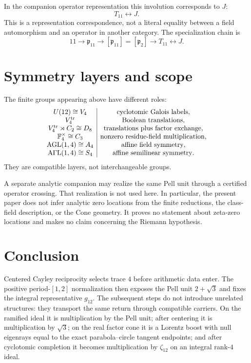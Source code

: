 \documentclass[11pt]{article}
\theoremstyle{remark}
\newcommand{\F}{\mathbb F}
\begin{document}
In the companion operator representation this involution corresponds to $J$:
\[
\boxed{T_{11}\longleftrightarrow J.}
\]
This is a representation correspondence, not a literal equality between a
field automorphism and an operator in another category.  The specialization
chain is
\[
\boxed{
11\longrightarrow\mathfrak p_{11}
\longrightarrow[\mathfrak p_{11}]=[\mathfrak p_2]
\longrightarrow T_{11}\longleftrightarrow J.}
\]

\section{Symmetry layers and scope}

The finite groups appearing above have different roles:
\[
\begin{array}{c|c}
U(12)\cong V_4 & \text{cyclotomic Galois labels},\\
V_4^{\rm tr} & \text{Boolean translations},\\
V_4^{\rm tr}\rtimes C_2\cong D_8 & \text{translations plus factor exchange},\\
\F_4^\times\cong C_3 & \text{nonzero residue-field multiplication},\\
\operatorname{AGL}(1,4)\cong A_4 & \text{affine field symmetry},\\
\operatorname{A\Gamma L}(1,4)\cong S_4 & \text{affine semilinear symmetry}.
\end{array}
\]
They are compatible layers, not interchangeable groups.

A separate analytic companion may realize the same Pell unit through a
certified operator crossing.  That realization is not used here.  In
particular, the present paper does not infer analytic zero locations from the
finite reductions, the class-field description, or the Cone geometry.  It
proves no statement about zeta-zero locations and makes no claim concerning
the Riemann hypothesis.

\section{Conclusion}

Centered Cayley reciprocity selects trace $4$ before arithmetic data enter.
The positive period-$[1,2]$ normalization then exposes the Pell unit
$2+\sqrt3$ and fixes the integral representative $g_{12}$.  The subsequent
steps do not introduce unrelated structures: they transport the same return
through compatible carriers.  On the ramified ideal it is multiplication by
the Pell unit; after centering it is multiplication by $\sqrt3$; on the real
factor cone it is a Lorentz boost with null eigenrays equal to the exact
parabola--circle tangent endpoints; and after cyclotomic completion it becomes
multiplication by $\zeta_{12}$ on an integral rank-$4$ ideal.
\end{document}

